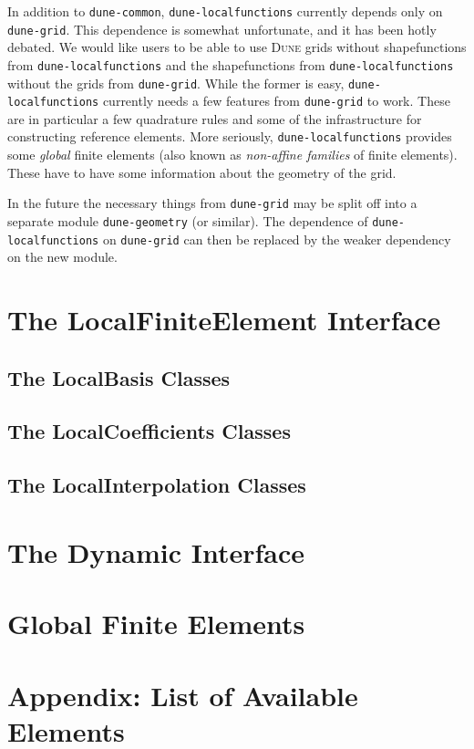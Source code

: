 \documentclass[a4paper,11pt]{article}
\newcommand{\dune}{\textsc{Dune}\xspace}
\newcommand{\modulename}[1]{\texttt{#1}\xspace}
\begin{document}
In addition to \modulename{dune-common}, \modulename{dune-localfunctions} currently
depends only on \modulename{dune-grid}.  This dependence is somewhat unfortunate,
and it has been hotly debated.  We would like users to be able to use \dune grids
without shapefunctions from \modulename{dune-localfunctions} and the shapefunctions
from \modulename{dune-localfunctions} without the grids from \modulename{dune-grid}.
While the former is easy, \modulename{dune-localfunctions} currently needs a few
features from \modulename{dune-grid} to work.  These are in particular a few
quadrature rules and some of the infrastructure for constructing reference elements.
More seriously, \modulename{dune-localfunctions} provides some {\em global} finite
elements (also known as {\em non-affine families} of finite elements).  These
have to have some information about the geometry of the grid.

In the future the necessary things from \modulename{dune-grid} may be split off
into a separate module \modulename{dune-geometry} (or similar).  The dependence of
\modulename{dune-localfunctions} on \modulename{dune-grid} can then be replaced
by the weaker dependency on the new module.


\section{The LocalFiniteElement Interface}
\label{sec:static_interface}

\subsection{The LocalBasis Classes}

\subsection{The LocalCoefficients Classes}

\subsection{The LocalInterpolation Classes}


\section{The Dynamic Interface}
\label{sec:dynamic_interface}

\section{Global Finite Elements}


\section{Appendix: List of Available Elements}



%
%
\end{document}
